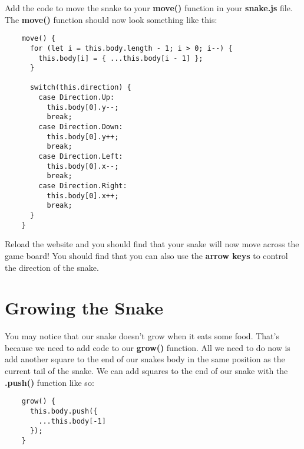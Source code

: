 \documentclass{article}
\begin{document}
  \noindent Add the code to move the snake to your \textbf{move()} function in your 
  \textbf{snake.js} file. The \textbf{move()} function should now look something like this:

  \begin{verbatim}
    move() {
      for (let i = this.body.length - 1; i > 0; i--) {
        this.body[i] = { ...this.body[i - 1] };
      }

      switch(this.direction) {
        case Direction.Up:
          this.body[0].y--;
          break;
        case Direction.Down:
          this.body[0].y++;
          break;
        case Direction.Left:
          this.body[0].x--;
          break;
        case Direction.Right:
          this.body[0].x++;
          break;
      }
    }
  \end{verbatim}

  \noindent Reload the website and you should find that your snake will now move across the game
  board! You should find that you can also use the \textbf{arrow keys} to control the direction
  of the snake.

  \pagebreak
  \section{Growing the Snake}
  You may notice that our snake doesn't grow when it eats some food. That's because we need
  to add code to our \textbf{grow()} function. All we need to do now is add another square to
  the end of our snakes body in the same position as the current tail of the snake. We can
  add squares to the end of our snake with the \textbf{.push()} function like so:

  \begin{verbatim}
    grow() {
      this.body.push({
        ...this.body[-1]
      });
    }
  \end{verbatim}
\end{document}
